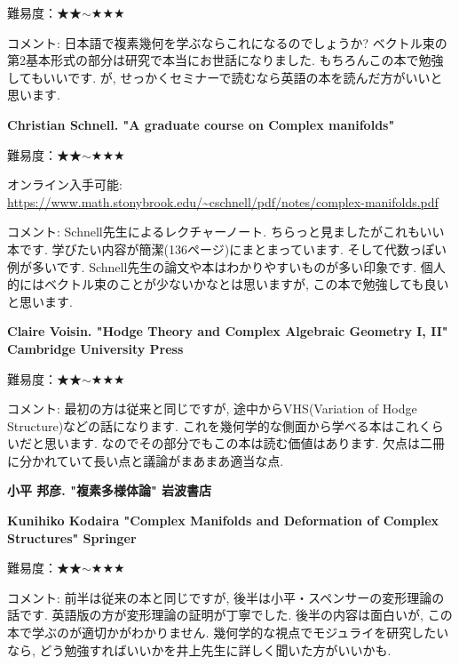 難易度：★★$\sim$★★★ \vspace{-6pt} 

コメント: 日本語で複素幾何を学ぶならこれになるのでしょうか? 
ベクトル束の第2基本形式の部分は研究で本当にお世話になりました. 
もちろんこの本で勉強してもいいです.  が, せっかくセミナーで読むなら英語の本を読んだ方がいいと思います. 
\vspace{8pt}

\textbf{Christian Schnell. "A graduate course on Complex manifolds" }  \vspace{-6pt} 

難易度：★★$\sim$★★★ \vspace{-6pt} 

オンライン入手可能: \url{https://www.math.stonybrook.edu/~cschnell/pdf/notes/complex-manifolds.pdf} \vspace{-6pt} 

コメント: Schnell先生によるレクチャーノート. ちらっと見ましたがこれもいい本です. 学びたい内容が簡潔(136ページ)にまとまっています. そして代数っぽい例が多いです. Schnell先生の論文や本はわかりやすいものが多い印象です.
個人的にはベクトル束のことが少ないかなとは思いますが, この本で勉強しても良いと思います.  
 
\vspace{8pt}


\textbf{Claire Voisin. "Hodge Theory and Complex Algebraic Geometry I, II" Cambridge University Press}  \vspace{-6pt} 

難易度：★★$\sim$★★★ \vspace{-6pt} 

コメント: 最初の方は従来と同じですが, 途中からVHS(Variation of Hodge Structure)などの話になります. これを幾何学的な側面から学べる本はこれくらいだと思います. なのでその部分でもこの本は読む価値はあります. 欠点は二冊に分かれていて長い点と議論がまあまあ適当な点. %
\vspace{8pt}

\textbf{小平 邦彦. "複素多様体論" 岩波書店}\vspace{-6pt}

\textbf{Kunihiko Kodaira "Complex Manifolds and Deformation of Complex Structures" Springer} \vspace{-6pt}

難易度：★★$\sim$★★★ \vspace{-6pt} 

コメント:  前半は従来の本と同じですが, 後半は小平・スペンサーの変形理論の話です. 英語版の方が変形理論の証明が丁寧でした. 後半の内容は面白いが, この本で学ぶのが適切かがわかりません. 幾何学的な視点でモジュライを研究したいなら, どう勉強すればいいかを井上先生に詳しく聞いた方がいいかも. 

